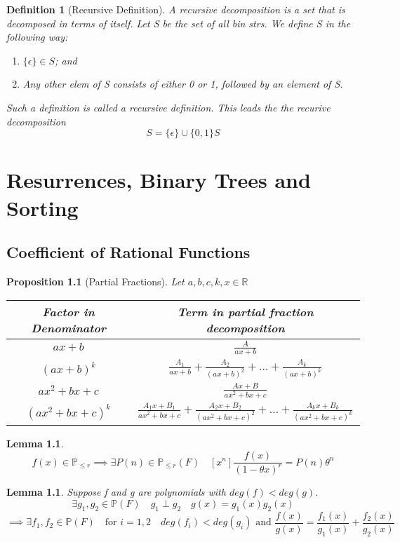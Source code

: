 \documentclass[11pt, oneside]{book}
\theoremstyle{break}
\newtheorem{lemma}[thm]{Lemma}
\newtheorem{propo}{Proposition}[section]
\newtheorem{defn}{Definition}[section]
\newcommand{\bb}[1]{\mathbb{#1}}		%
\begin{document}
\begin{defn}[Recursive Definition]
	A recursive decomposition is a set that is decomposed in terms of itself. Let S be the set of all bin strs. We define S in the following way:
	\begin{enumerate}
		\item $\{\epsilon\} \in S$; and
		\item Any other elem of S consists of either 0 or 1, followed by an element of S.
	\end{enumerate}
	Such a definition is called a recursive definition. This leads the the recurive decomposition
	\[
		S = \{\epsilon\} \cup \{0, 1\}S
	\]
\end{defn}



\chapter{Resurrences, Binary Trees and Sorting}


\section{Coefficient of Rational Functions}

\begin{propo}[Partial Fractions]
	Let $a, b, c, k, x \in \bb{R}$
	\begin{center}
		\begin{tabular}{c | c}
			Factor in Denominator	&	Term in partial fraction decomposition \\
			\hline
			$ax + b$	 &	$\frac{A}{ax+b}$ \\
			$(ax+b)^k$	&	$\frac{A_1}{ax+b} + \frac{A_2}{(ax+b)^2} + \hdots + \frac{A_k}{(ax+b)^k}$\\
			$ax^2 + bx + c$	& $\frac{Ax+B}{ax^2 + bx + c}$\\
			$(ax^2 + bx + c)^k$	& $\frac{A_1x + B_1}{ax^2 + bx + c} + \frac{A_2x + B_2}{(ax^2 + bx + c)^2} + \hdots + \frac{A_kx + B_k}{(ax^2 + bx + c)^k}$
		\end{tabular}
	\end{center}
\end{propo}

\begin{lemma}
	\[
		f(x) \in \bb{P}_{\leq r} \implies \exists P(n) \in \bb{P}_{\leq r}(F) \quad [x^n]\frac{f(x)}{(1-\theta x)^r} = P(n) \theta^n
	\]
\end{lemma}

\begin{lemma}
	Suppose f and g are polynomials with $deg(f) < deg(g)$.
	\[
		\exists g_1, g_2 \in \bb{P}(F) \quad g_1 \perp g_2 \quad g(x) = g_1(x)g_2(x)
	\]
	\[
		\implies \exists f_1, f_2 \in \bb{P}(F) \quad \text{for } i = 1, 2 \quad deg(f_i) < deg(g_i) \text{ and } \frac{f(x)}{g(x)} = \frac{f_1(x)}{g_1(x)} + \frac{f_2(x)}{g_2(x)}
	\]
\end{lemma}
\end{document}
